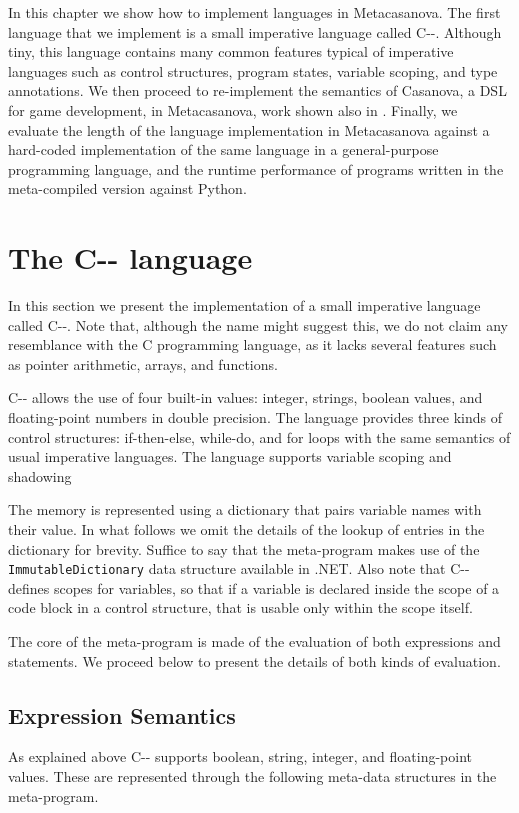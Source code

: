 In this chapter we show how to implement languages in Metacasanova. The first language that we implement is a small imperative language called C-{}-. Although tiny, this language contains many common features typical of imperative languages such as control structures, program states, variable scoping, and type annotations. We then proceed to re-implement the semantics of Casanova, a DSL for game development, in Metacasanova, work shown also in \cite{DiGiacomo2017}. Finally, we evaluate the length of the language implementation in Metacasanova against a hard-coded implementation of the same language in a general-purpose programming language, and the runtime performance of programs written in the meta-compiled version against Python.

\section{The C-{}- language}
In this section we present the implementation of a small imperative language called C-{}-. Note that, although the name might suggest this, we do not claim any resemblance with the C programming language, as it lacks several features such as pointer arithmetic, arrays, and functions.

C-{}- allows the use of four built-in values: integer, strings, boolean values, and floating-point numbers in double precision. The language provides three kinds of control structures: if-then-else, while-do, and for loops with the same semantics of usual imperative languages. The language supports variable scoping and shadowing

The memory is represented using a dictionary that pairs variable names with their value. In what follows we omit the details of the lookup of entries in the dictionary for brevity. Suffice to say that the meta-program makes use of the \texttt{ImmutableDictionary} data structure available in .NET. Also note that C-{}- defines scopes for variables, so that if a variable is declared inside the scope of a code block in a control structure, that is usable only within the scope itself.

The core of the meta-program is made of the evaluation of both expressions and statements. We proceed below to present the details of both kinds of evaluation.

\subsection{Expression Semantics}
\label{subsec:ch_mcnv_languages_expression_semantics}
As explained above C-{}- supports boolean, string, integer, and floating-point values. These are represented through the following meta-data structures in the meta-program.

